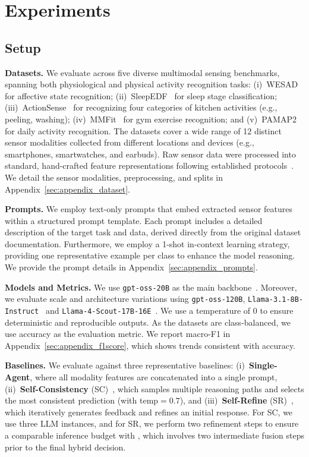 \section{Experiments}
\label{sec:experiments}

\subsection{Setup}
\label{sec:exp_setups}

\noindent \textbf{Datasets.} We evaluate \system{} across five diverse multimodal sensing benchmarks, spanning both physiological and physical activity recognition tasks: (i)~WESAD~\citep{wesad} for affective state recognition; (ii)~SleepEDF~\citep{sleepedf} for sleep stage classification; (iii)~ActionSense~\citep{actionsense} for recognizing four categories of kitchen activities (e.g., peeling, washing); (iv)~MMFit~\citep{mmfit} for gym exercise recognition; and (v)~PAMAP2~\citep{pamap2} for daily activity recognition. The datasets cover a wide range of 12 distinct sensor modalities collected from different locations and devices (e.g., smartphones, smartwatches, and earbuds). Raw sensor data were processed into standard, hand-crafted feature representations following established protocols~\citep{wesad, sleepedf_features}. We detail the sensor modalities, preprocessing, and splits in Appendix~\ref{sec:appendix_dataset}.

\noindent \textbf{Prompts.} We employ text-only prompts that embed extracted sensor features within a structured prompt template. Each prompt includes a detailed description of the target task and data, derived directly from the original dataset documentation. 
Furthermore, we employ a 1-shot in-context learning strategy, providing one representative example per class to enhance the model reasoning. We provide the prompt details in Appendix~\ref{sec:appendix_prompts}.

\noindent \textbf{Models and Metrics.} We use \texttt{gpt-oss-20B} as the main backbone~\citep{gptoss}. Moreover, we evaluate scale and architecture variations using \texttt{gpt-oss-120B}, \texttt{Llama-3.1-8B-Instruct}~\citep{llama3} and \texttt{Llama-4-Scout-17B-16E}~\citep{llama4}. We use a temperature of 0 to ensure deterministic and reproducible outputs. As the datasets are class-balanced, we use accuracy as the evaluation metric. We report macro-F1 in Appendix~\ref{sec:appendix_f1score}, which shows trends consistent with accuracy.

\noindent \textbf{Baselines.} We evaluate \system{} against three representative baselines: (i)~\textbf{Single-Agent}, where all modality features are concatenated into a single prompt, (ii)~\textbf{Self-Consistency} (SC)~\citep{sc}, which samples multiple reasoning paths and selects the most consistent prediction (with temp$=0.7$), and (iii)~\textbf{Self-Refine} (SR)~\citep{sr}, which iteratively generates feedback and refines an initial response. For SC, we use three LLM instances, and for SR, we perform two refinement steps to ensure a comparable inference budget with \system{}, which involves two intermediate fusion steps prior to the final hybrid decision.

